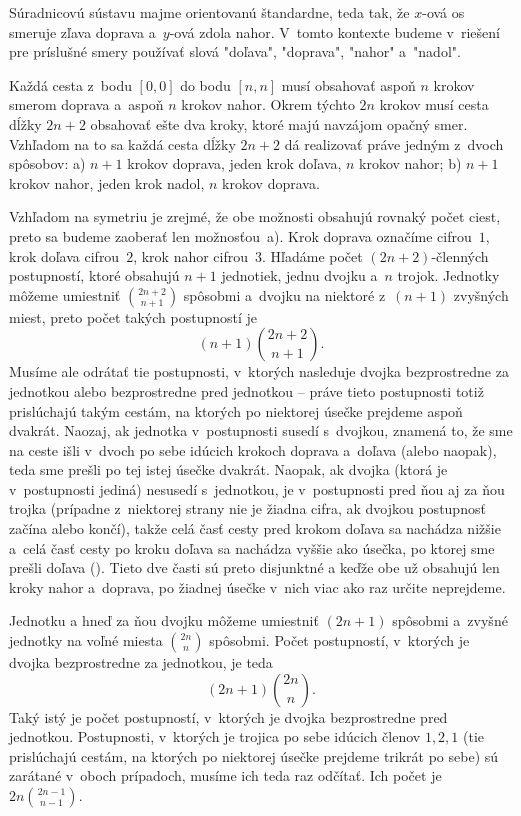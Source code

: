 {%
Súradnicovú sústavu majme orientovanú štandardne, teda tak, že $x$-ová os smeruje zľava doprava a~$y$-ová zdola nahor. V~tomto kontexte budeme v~riešení pre príslušné smery používať slová "doľava", "doprava", "nahor" a~"nadol".

Každá cesta z~bodu $[0,0]$ do bodu $[n,n]$ musí obsahovať aspoň $n$ krokov smerom doprava a~aspoň $n$ krokov nahor. Okrem týchto $2n$ krokov musí cesta dĺžky $2n+2$ obsahovať ešte dva kroky, ktoré majú navzájom opačný smer. Vzhľadom na to sa každá cesta dĺžky $2n+2$ dá realizovať práve jedným z~dvoch spôsobov:
\smallskip
\ite a) $n+1$ krokov doprava, jeden krok doľava, $n$ krokov nahor;
\ite b) $n+1$ krokov nahor, jeden krok nadol, $n$ krokov doprava.

\smallskip
Vzhľadom na symetriu je zrejmé, že obe možnosti obsahujú rovnaký počet ciest, preto sa budeme zaoberať len možnosťou~a). Krok doprava označíme cifrou~$1$, krok doľava cifrou~$2$, krok nahor cifrou~$3$. Hľadáme počet $(2n+2)$-členných postupností, ktoré obsahujú $n+1$ jednotiek, jednu dvojku a~$n$ trojok. Jednotky môžeme umiestniť ${2n+2\choose{n+1}}$ spôsobmi a~dvojku na niektoré z~$(n+1)$ zvyšných miest, preto počet takých postupností je
$$
(n+1){2n+2\choose{n+1}}.
$$
Musíme ale odrátať tie postupnosti, v~ktorých nasleduje dvojka bezprostredne za jednotkou alebo bezprostredne pred jednotkou -- práve tieto postupnosti totiž prislúchajú takým cestám, na ktorých po niektorej úsečke prejdeme aspoň dvakrát. Naozaj, ak jednotka v~postupnosti susedí s~dvojkou, znamená to, že sme na ceste išli v~dvoch po sebe idúcich krokoch doprava a~doľava (alebo naopak), teda sme prešli po tej istej úsečke dvakrát. Naopak, ak dvojka (ktorá je v~postupnosti jediná) nesusedí s~jednotkou, je v~postupnosti pred ňou aj za ňou trojka (prípadne z~niektorej strany nie je žiadna cifra, ak dvojkou postupnosť začína alebo končí), takže celá časť cesty pred krokom doľava sa nachádza nižšie a~celá časť cesty po kroku doľava sa nachádza vyššie ako úsečka, po ktorej sme prešli doľava (\obr). Tieto dve časti sú preto disjunktné a keďže obe už obsahujú len kroky nahor a~doprava, po žiadnej úsečke v~nich viac ako raz určite neprejdeme.
%

Jednotku a hneď za ňou dvojku môžeme umiestniť $(2n+1)$ spôsobmi a~zvyšné jednotky na voľné miesta ${2n\choose n}$ spôsobmi. Počet postupností, v~ktorých je dvojka bezprostredne za jednotkou, je teda
$$
(2n+1){2n\choose n}.
$$
Taký istý je počet postupností, v~ktorých je dvojka bezprostredne pred jednotkou. Postupnosti, v~ktorých je trojica po sebe idúcich členov $1,2,1$ (tie prislúchajú cestám, na ktorých po niektorej úsečke prejdeme trikrát po sebe) sú zarátané v~oboch prípadoch, musíme ich teda raz odčítať. Ich počet je $2n{2n-1\choose{n-1}}$.

}
